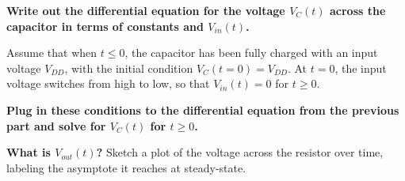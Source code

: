\begin{enumerate}

\qitem \textbf{Write out the differential equation for the voltage $V_{C}(t)$ across the capacitor in terms of constants and $V_{in}(t)$.}

\ws{
\vspace{50px}
}


\qitem 
Assume that when $t\leq 0$, the capacitor has been fully charged with an input voltage $V_{DD}$, with the initial condition $V_C(t=0) = V_{DD}$.
At $t=0$, the input voltage switches from high to low, so that $V_{in}(t) = 0$ for $t \geq 0$.

\textbf{Plug in these conditions to the differential equation from the previous part and solve for $V_{C}(t)$ for $t \geq 0$.}

\ws{
\vspace{50px}
}


\qitem \textbf{What is $V_{out}(t)$?} Sketch a plot of the voltage across the resistor over time, labeling the asymptote it reaches at steady-state.


\end{enumerate}
